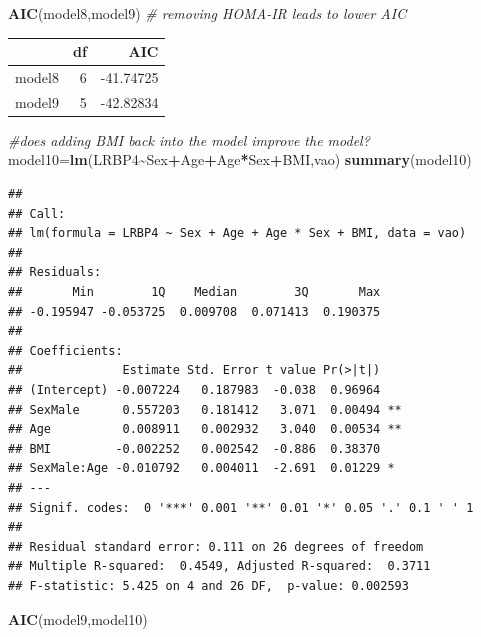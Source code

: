 \documentclass[
]{article}
\newenvironment{Shaded}{\begin{snugshade}}{\end{snugshade}}
\newcommand{\CommentTok}[1]{\textcolor[rgb]{0.56,0.35,0.01}{\textit{#1}}}
\newcommand{\FunctionTok}[1]{\textcolor[rgb]{0.13,0.29,0.53}{\textbf{#1}}}
\newcommand{\NormalTok}[1]{#1}
\newcommand{\OtherTok}[1]{\textcolor[rgb]{0.56,0.35,0.01}{#1}}
\newcommand{\SpecialCharTok}[1]{\textcolor[rgb]{0.81,0.36,0.00}{\textbf{#1}}}
\begin{document}
\begin{Shaded}
\begin{Highlighting}[]
\FunctionTok{AIC}\NormalTok{(model8,model9) }\CommentTok{\# removing HOMA{-}IR leads to lower AIC}
\end{Highlighting}
\end{Shaded}

\begin{longtable}[]{@{}lrr@{}}
\toprule\noalign{}
& df & AIC \\
\midrule\noalign{}
\endhead
\bottomrule\noalign{}
\endlastfoot
model8 & 6 & -41.74725 \\
model9 & 5 & -42.82834 \\
\end{longtable}

\begin{Shaded}
\begin{Highlighting}[]
\CommentTok{\#does adding BMI back into the model improve the model?}
\NormalTok{model10}\OtherTok{=}\FunctionTok{lm}\NormalTok{(LRBP4}\SpecialCharTok{\textasciitilde{}}\NormalTok{Sex}\SpecialCharTok{+}\NormalTok{Age}\SpecialCharTok{+}\NormalTok{Age}\SpecialCharTok{*}\NormalTok{Sex}\SpecialCharTok{+}\NormalTok{BMI,vao)}
\FunctionTok{summary}\NormalTok{(model10)}
\end{Highlighting}
\end{Shaded}

\begin{verbatim}
## 
## Call:
## lm(formula = LRBP4 ~ Sex + Age + Age * Sex + BMI, data = vao)
## 
## Residuals:
##       Min        1Q    Median        3Q       Max 
## -0.195947 -0.053725  0.009708  0.071413  0.190375 
## 
## Coefficients:
##              Estimate Std. Error t value Pr(>|t|)   
## (Intercept) -0.007224   0.187983  -0.038  0.96964   
## SexMale      0.557203   0.181412   3.071  0.00494 **
## Age          0.008911   0.002932   3.040  0.00534 **
## BMI         -0.002252   0.002542  -0.886  0.38370   
## SexMale:Age -0.010792   0.004011  -2.691  0.01229 * 
## ---
## Signif. codes:  0 '***' 0.001 '**' 0.01 '*' 0.05 '.' 0.1 ' ' 1
## 
## Residual standard error: 0.111 on 26 degrees of freedom
## Multiple R-squared:  0.4549, Adjusted R-squared:  0.3711 
## F-statistic: 5.425 on 4 and 26 DF,  p-value: 0.002593
\end{verbatim}

\begin{Shaded}
\begin{Highlighting}[]
\FunctionTok{AIC}\NormalTok{(model9,model10)}
\end{Highlighting}
\end{Shaded}
\end{document}
